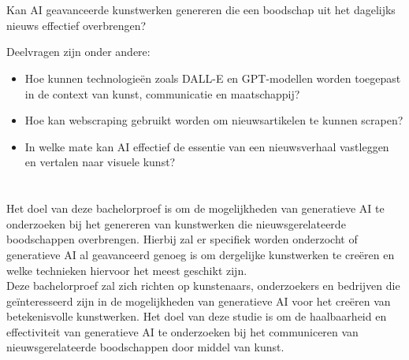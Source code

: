 \section{}%
\label{sec:onderzoeksvraag}

\noindent
Kan AI geavanceerde kunstwerken genereren die een boodschap uit het dagelijks nieuws effectief overbrengen?

Deelvragen zijn onder andere:

\begin{itemize}
    \item Hoe kunnen technologieën zoals DALL-E en GPT-modellen worden toegepast in de context van kunst, communicatie en maatschappij?
    \item Hoe kan webscraping gebruikt worden om nieuwsartikelen te kunnen scrapen?
    \item In welke mate kan AI effectief de essentie van een nieuwsverhaal vastleggen en vertalen naar visuele kunst?
\end{itemize}

\pagebreak

\section{}%
\label{sec:onderzoeksdoelstelling}

\noindent
Het doel van deze bachelorproef is om de mogelijkheden van generatieve AI te onderzoeken bij het genereren van kunstwerken die nieuwsgerelateerde boodschappen overbrengen. Hierbij zal er specifiek worden onderzocht of generatieve AI al geavanceerd genoeg is om dergelijke kunstwerken te creëren en welke technieken hiervoor het meest geschikt zijn.  \\

Deze bachelorproef zal zich richten op kunstenaars, onderzoekers en bedrijven die geïnteresseerd zijn in de mogelijkheden van generatieve AI voor het creëren van betekenisvolle kunstwerken. Het doel van deze studie is om de haalbaarheid en effectiviteit van generatieve AI te onderzoeken bij het communiceren van nieuwsgerelateerde boodschappen door middel van kunst. 

\section{}%
\label{sec:opzet-bachelorproef}

